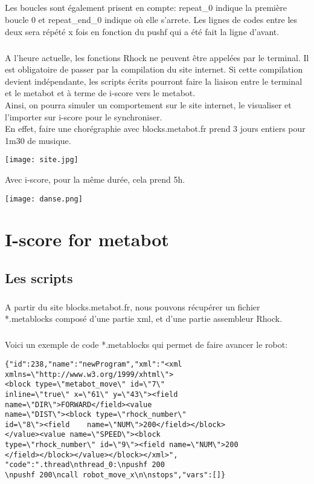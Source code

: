 \documentclass[10pt,a4paper]{report}
\begin{document}
\paragraph{}
Les boucles sont également prisent en compte: repeat\_0 indique la première boucle 0 et repeat\_end\_0 indique où elle s'arrete. Les lignes de codes entre les deux sera répété x fois en fonction du pushf qui a été fait la ligne d'avant.
\paragraph{}
A l'heure actuelle, les fonctions Rhock ne peuvent être appelées par le terminal. Il est obligatoire de passer par la compilation du site internet. Si cette compilation devient indépendante, les scripts écrits pourront faire la liaison entre le terminal et le metabot et à terme de i-score vers le metabot.
\\
Ainsi, on pourra simuler un comportement sur le site internet, le visualiser et l'importer sur i-score pour le synchroniser.
\\
En effet, faire une chorégraphie avec blocks.metabot.fr prend 3 jours entiers pour 1m30 de musique. 
\begin{center}
\texttt{[image: site.jpg]}
\end{center}
Avec i-score, pour la même durée, cela prend 5h.

\begin{center}
\texttt{[image: danse.png]}
\end{center}

\chapter{I-score for metabot}
\section{Les scripts}
\paragraph{}
A partir du site blocks.metabot.fr, nous pouvons récupérer un fichier *.metablocks composé d'une partie xml, et d'une partie assembleur Rhock.
\paragraph{}
Voici un exemple de code *.metablocks qui permet de faire avancer le robot:
\begin{verbatim}
{"id":238,"name":"newProgram","xml":"<xml
xmlns=\"http://www.w3.org/1999/xhtml\">
<block type=\"metabot_move\" id=\"7\"
inline=\"true\" x=\"61\" y=\"43\"><field
name=\"DIR\">FORWARD</field><value
name=\"DIST\"><block type=\"rhock_number\"
id=\"8\"><field    name=\"NUM\">200</field></block>
</value><value name=\"SPEED\"><block 
type=\"rhock_number\" id=\"9\"><field name=\"NUM\">200
</field></block></value></block></xml>",
"code":".thread\nthread_0:\npushf 200
\npushf 200\ncall robot_move_x\n\nstops","vars":[]}
\end{verbatim}
\end{document}
